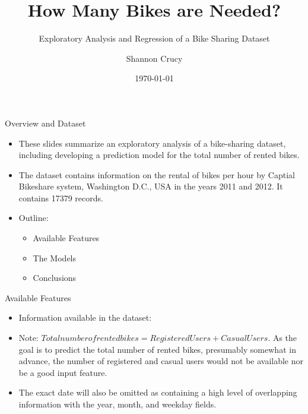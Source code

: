 \documentclass[pdf]{beamer}
\title{How Many Bikes are Needed?}
\subtitle{Exploratory Analysis and Regression of a Bike Sharing Dataset}
\author[S.Crucy]{Shannon Crucy \\%
}
\date{\today}
\begin{document}

\begin{frame}
\titlepage
\end{frame}


\begin{frame}{Overview and Dataset}
\begin{itemize}
\item{These slides summarize an exploratory analysis of a bike-sharing dataset, including developing a prediction model for the total number of rented bikes.}
\item{The dataset contains information on the rental of bikes per hour by Captial Bikeshare system, Washington D.C., USA in the years 2011 and 2012.  It contains 17379 records.}
\item{Outline:}
\begin{itemize}
\item{Available Features}
\item{The Models}
\item{Conclusions}
\end{itemize}
\end{itemize}
\end{frame}


\begin{frame}{Available Features}
\begin{itemize}
\item{Information available in the dataset:}
\begin{center}
\end{center}
\small
\item{Note: $Total number of rented bikes = Registered Users + Casual Users$.  As the goal is to predict the total number of rented bikes, presumably somewhat in advance, the number of registered and casual users would not be available nor be a good input feature.}
\item{The exact date will also be omitted as containing a high level of overlapping information with the year, month, and weekday fields.}
\end{itemize}
\end{frame}
\end{document}

